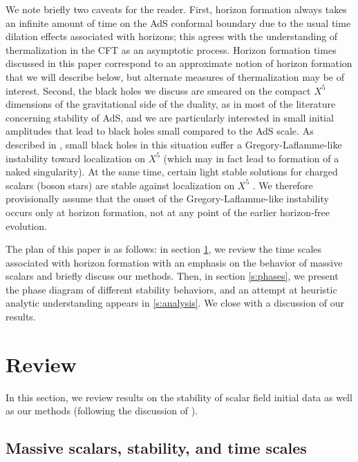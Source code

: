 \documentclass[../PhD.tex]{subfiles}
\begin{document}
We note briefly two caveats for the reader.  First, horizon formation
always takes an infinite amount of time on the AdS conformal boundary
due to the usual time dilation effects associated with horizons; this agrees
with the understanding of thermalization in the CFT as an asymptotic process.
Horizon formation times discussed in this paper correspond to an approximate
notion of horizon formation that we will describe below, but alternate
measures of thermalization may be of interest.  Second, the black holes
we discuss are smeared on the compact $X^5$ dimensions of the gravitational
side of the duality, as in most of the literature concerning stability of
AdS, and we are particularly interested in small initial amplitudes that
lead to black holes small compared to the AdS scale. As described in
\cite{hep-th/0202189,1502.01574,1509.07780}, small black holes in this
situation suffer a Gregory-Laflamme-like instability toward localization
on $X^5$ (which may in fact lead to formation of a naked singularity).  At
the same time, certain light stable solutions for charged scalars (boson
stars) are stable against localization on $X^5$ \cite{1509.00774}.  We
therefore provisionally assume that the onset of the Gregory-Laflamme-like
instability occurs only at horizon formation, not at any point of the
earlier horizon-free evolution.


The plan of this paper is as follows: in section \ref{s:review}, we review
the time scales associated with horizon formation with an emphasis on
the behavior of massive scalars and briefly discuss our methods.  Then,
in section \ref{s:phases}, we present the phase diagram of different
stability behaviors, and an attempt at heuristic analytic understanding 
appears in \ref{s:analysis}.
We close with a discussion of our results.


\section{Review}\label{s:review}
In this section, we review results on the stability of scalar field initial
data as well as our methods (following the discussion of \cite{1508.02709}).

\subsection{Massive scalars, stability, and time scales}
\end{document}
